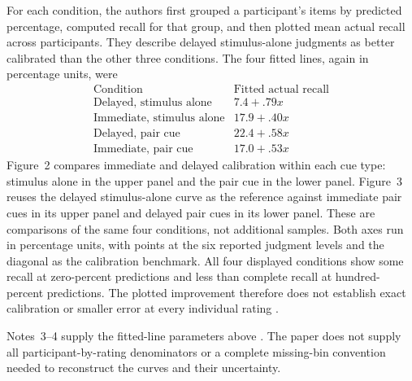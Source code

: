For each condition, the authors first grouped a participant's
items by predicted percentage, computed recall for that group,
and then plotted mean actual recall across participants.
They describe delayed stimulus-alone judgments as better
calibrated than the other three conditions. The four fitted
lines, again in percentage units, were
\[
\begin{array}{l|l}
 \text{Condition}&\text{Fitted actual recall}\\\hline
 \text{Delayed, stimulus alone}&7.4+.79x\\
 \text{Immediate, stimulus alone}&17.9+.40x\\
 \text{Delayed, pair cue}&22.4+.58x\\
 \text{Immediate, pair cue}&17.0+.53x
\end{array}
\]
Figure~2 compares immediate and delayed calibration within each
cue type: stimulus alone in the upper panel and the pair cue
in the lower panel. Figure~3 reuses the delayed stimulus-alone
curve as the reference against immediate pair cues in its upper
panel and delayed pair cues in its lower panel. These are
comparisons of the same four conditions, not additional samples.
Both axes run in percentage units, with points at the six
reported judgment levels and the diagonal as the calibration
benchmark. All four displayed conditions show some recall at
zero-percent predictions and less than complete recall at
hundred-percent predictions. The plotted improvement therefore
does not establish exact calibration or smaller error at every
individual rating \cite[pp.~376--377, figs.~1--3]{DunloskyNelson1992CueJOL}.

Notes~3--4 supply the fitted-line parameters above
\cite[p.~380]{DunloskyNelson1992CueJOL}.
The paper does not supply all participant-by-rating denominators
or a complete missing-bin convention needed to reconstruct the
curves and their uncertainty.

